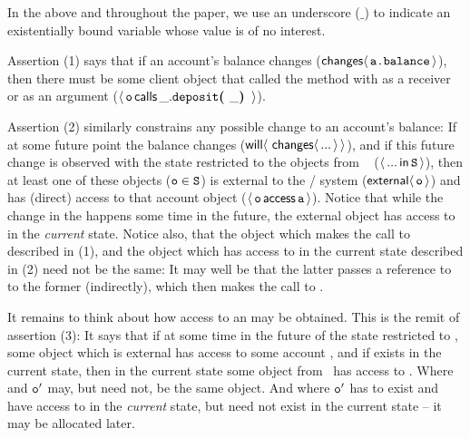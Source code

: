 \noindent 
In the above and throughout the paper, we use an underscore ($\_$) to indicate an existentially bound variable whose 
value is of no interest.

\vspace{.2cm}

Assertion (1) %
says that if   an account's balance changes
($\Changes{\prg{a.balance}}$),
then there must be some client object 
that %
called the  method with  as a receiver or as an argument 
($\Calls{\prg{o}} {\prg{deposit}} {\_} {\_}$).
 
Assertion (2) similarly constrains any possible change to an 
account's balance: 
If at some future point the balance changes  (${\Future{\,\Changes{...}}}$),  %
and if this future change is observed with the state restricted to the objects from \SF~ (\ie $\Using{...}{\prg{S}}$), then 
at least one of these objects ($\prg{o}\in\SF$) is external to the / system ($\External{\prg{o}}$) and 
has (direct) access to that account object
($\CanAccess{\prg{o}}{\prg{a}}$).
Notice that while the change in the  happens some time in the future,
the external object  has access to  in the \emph{current} state.
Notice also, that the object which makes the call to  described in (1), and the object which 
has access to  in the current state described in (2) need not be the same: It may well be that the
latter passes  a reference to  to the former (indirectly), which then makes the call
to .

It remains to think about how access to an  may be obtained. This is the remit of assertion (3): 
It says that if at some time in the future of the state restricted to \SF, 
some object  which is external has access to some account , and if  exists in the 
current state, then in the current state some object 
from \SF~has access to . Where  and $\prg{o}'$ may, but need not, be the same object. And where
 $\prg{o}'$ has to exist and have access to  in the \emph{current} state, but 
 need not exist in the current state -- it may be allocated later.

